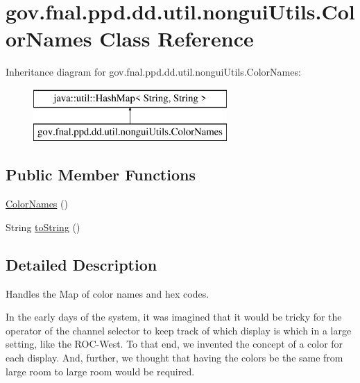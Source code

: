 \hypertarget{classgov_1_1fnal_1_1ppd_1_1dd_1_1util_1_1nonguiUtils_1_1ColorNames}{\section{gov.\-fnal.\-ppd.\-dd.\-util.\-nongui\-Utils.\-Color\-Names Class Reference}
\label{classgov_1_1fnal_1_1ppd_1_1dd_1_1util_1_1nonguiUtils_1_1ColorNames}
}
Inheritance diagram for gov.\-fnal.\-ppd.\-dd.\-util.\-nongui\-Utils.\-Color\-Names\-:\begin{figure}[H]
\begin{center}
\leavevmode
\includegraphics[height=2.000000cm]{classgov_1_1fnal_1_1ppd_1_1dd_1_1util_1_1nonguiUtils_1_1ColorNames}
\end{center}
\end{figure}
\subsection*{Public Member Functions}
\begin{DoxyCompactItemize}
\item 
\hyperlink{classgov_1_1fnal_1_1ppd_1_1dd_1_1util_1_1nonguiUtils_1_1ColorNames_a33e7e1d6596187e15f63db7c3f07b391}{Color\-Names} ()
\item 
String \hyperlink{classgov_1_1fnal_1_1ppd_1_1dd_1_1util_1_1nonguiUtils_1_1ColorNames_ab2ef68816f5dfde5d491fd4dd35f4f5f}{to\-String} ()
\end{DoxyCompactItemize}


\subsection{Detailed Description}
Handles the Map of color names and hex codes.

In the early days of the system, it was imagined that it would be tricky for the operator of the channel selector to keep track of which display is which in a large setting, like the R\-O\-C-\/\-West. To that end, we invented the concept of a color for each display. And, further, we thought that having the colors be the same from large room to large room would be required.

